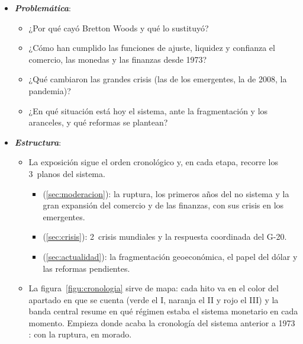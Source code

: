 \documentclass[11pt]{article}
\begin{document}
\begin{itemize}
\item \textbf{\emph{Problemática}}:
  \begin{itemize}
  \item ¿Por qué cayó Bretton Woods y qué lo sustituyó?
  \item ¿Cómo han cumplido las funciones de ajuste, liquidez y confianza el comercio, las monedas y las finanzas desde 1973?
  \item ¿Qué cambiaron las grandes crisis (las de los emergentes, la de 2008, la pandemia)?
  \item ¿En qué situación está hoy el sistema, ante la fragmentación y los aranceles, y qué reformas se plantean?
  \end{itemize}

\item \textbf{\emph{Estructura}}:
  \begin{itemize}
  \item La exposición sigue el orden cronológico y, en cada etapa, recorre los 3~planos del sistema.
    \begin{itemize}
    \item {} (\ref{sec:moderacion}): la ruptura, los primeros años del no sistema y la gran expansión del comercio y de las finanzas, con sus crisis en los emergentes.
    \item {} (\ref{sec:crisis}): 2~crisis mundiales y la respuesta coordinada del G-20.
    \item {} (\ref{sec:actualidad}): la fragmentación geoeconómica, el papel del dólar y las reformas pendientes.
    \end{itemize}
  \item La figura~\ref{figu:cronologia} sirve de mapa: cada hito va en el color del apartado en que se cuenta (verde el I, naranja el II y rojo el III) y la banda central resume en qué régimen estaba el sistema monetario en cada momento. Empieza donde acaba la cronología del sistema anterior a 1973 : con la ruptura, en morado.
  \end{itemize}
\end{itemize}

\begin{infografia}[H]
\centering
\caption{El sistema económico internacional, 1971-2026}\label{figu:cronologia}
\end{infografia}
\end{document}
